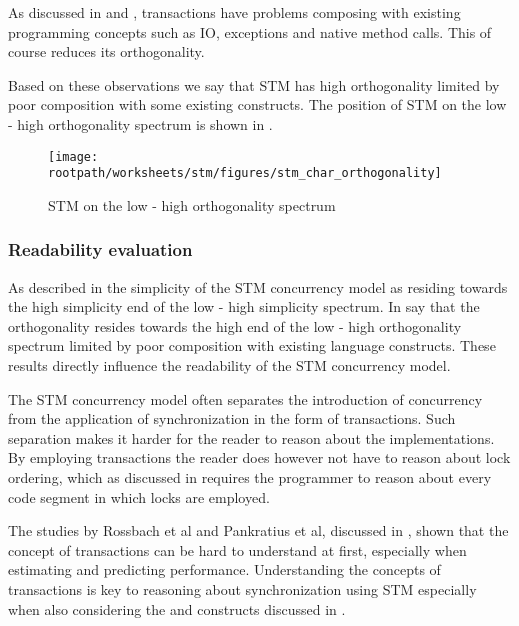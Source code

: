 As discussed in  and , transactions have problems composing with existing programming concepts such as \ac{IO}, exceptions and native method calls. This of course reduces its orthogonality.


Based on these observations we say that \ac{STM} has high orthogonality limited by poor composition with some existing constructs. The position of \ac{STM} on the low - high orthogonality spectrum is shown in .

\begin{figure}[htbp]
\centering
 \texttt{[image: \\rootpath/worksheets/stm/figures/stm\_char\_orthogonality]} 
 \caption{\ac{STM} on the low - high orthogonality spectrum}
\label{fig:char_stm_orthogonality}
\end{figure}

\subsubsection{Readability evaluation}
As described in  the simplicity of the \ac{STM} concurrency model as residing towards the high simplicity end of the low - high simplicity spectrum. In  say that the orthogonality resides towards the high end of the low - high orthogonality spectrum limited by poor composition with existing language constructs. These results directly influence the readability of the \ac{STM} concurrency model.

The \ac{STM} concurrency model often separates the introduction of concurrency from the application of synchronization in the form of transactions. Such separation makes it harder for the reader to reason about the implementations. By employing transactions the reader does however not have to reason about lock ordering, which as discussed in  requires the programmer to reason about every code segment in which locks are employed.

The studies by Rossbach et al and Pankratius et al, discussed in , shown that the concept of transactions can be hard to understand at first, especially when estimating and predicting performance. Understanding the concepts of transactions is key to reasoning about synchronization using \ac{STM} especially when also considering the  and  constructs discussed in .

